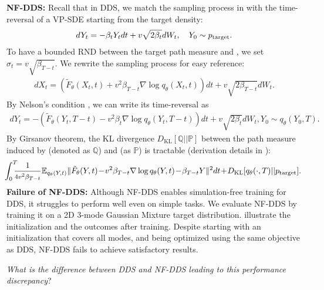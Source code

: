 \textbf{NF-DDS:} 
Recall that in DDS, we match the sampling process in  with the time-reversal of a VP-SDE starting from the target density: \vspace{-2pt}
\begin{align}\label{eq:target}
   dY_t = -\beta_t Y_t dt + v \sqrt{2\beta_{t}} dW_t, \quad  Y_0 \sim p_\text{target}. 
\end{align}
To have a bounded RND between the target path measure and , we set $\sigma_t= v\sqrt{\beta_{T-t}}$. 
We rewrite the sampling process for easy reference: \vspace{-2pt}
\begin{align}\label{eq:nf-sde-dds}
        dX_t = \left(\tilde{F}_\theta(X_t, t) + v^2\beta_{T-t} \nabla\log q_\theta(X_t, t) \right)dt + v\sqrt{2\beta_{T-t}} dW_t.
    \end{align}  
By Nelson's condition \citep{nelson,ANDERSON1982313}, we can write its time-reversal as  \vspace{-2pt} 
\begin{align}\label{eq:nf-sde-dds-backward}
      dY_t = -\left(\tilde{F}_\theta(Y_t, T-t) - v^2\beta_{t} \nabla\log q_\theta(Y_t, T-t) \right)dt + v\sqrt{2\beta_{t}} dW_t, Y_0 \sim q_\theta(Y_0, T).
    \end{align} 
By Girsanov theorem, the KL divergence $D_\text{KL}[\mathbb{Q}||\mathbb{P}]$ between the path measure induced by  (denoted as $\mathbb{Q}$) and  (as $\mathbb{P}$) is tractable (derivation details in ): \vspace{-6pt}
\begin{align}\label{eq:flowDDS-obj}
  \!
   \! \int_0^T\!\!\! \!\frac{1}{\text{\footnotesize$4v^2\beta_{T-t}$}} \E_{{q_\theta(Y, t)}} \|
\tilde{F}_\theta(Y, t) \!- \!v^2\beta_{T-t} \nabla\log q_\theta(Y, t) \!- \!\beta_{T-t} Y
    \|^2 dt\!+ \!D_\text{KL}[q_\theta(\cdot, T)|| \ptarget].
\end{align}
\textbf{Failure of NF-DDS: } Although NF-DDS enables simulation-free training for DDS, it struggles to perform well even on simple tasks. 
We evaluate NF-DDS by training it on a 2D 3-mode Gaussian Mixture target distribution.  illustrate the initialization and the outcomes after training. 
Despite starting with an initialization that covers all modes, and being optimized using the same objective as DDS, NF-DDS fails to achieve satisfactory results.
\par
\emph{What is the difference between DDS and NF-DDS leading to this performance discrepancy}?
